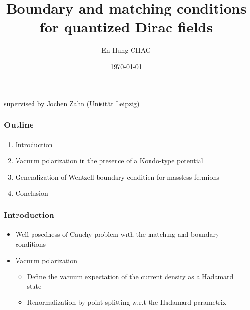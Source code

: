 \documentclass[english]{beamer}
\title{Boundary and matching conditions for quantized Dirac fields}
\author{En-Hung CHAO}
\institute{{\'E}cole Polytechnique \& Universit{\"a}t Leipzig}
\date{\today}
\begin{document}

\begin{frame}
\titlepage%
\centerline{supervised by Jochen Zahn (Unisit{\"a}t Leipzig)}
\end{frame}
\begin{frame}
\frametitle{Outline}
\framesubtitle{}

\begin{enumerate}

\item Introduction
\item Vacuum polarization in the presence of a Kondo-type potential
\item Generalization of Wentzell boundary condition for massless fermions
\item Conclusion

\end{enumerate}

\end{frame}
\begin{frame}
\frametitle{Introduction}
\framesubtitle{}

\begin{itemize}
\item<1-> Well-posedness of Cauchy problem with the matching and boundary conditions
\item<2-> Vacuum polarization 
	\begin{itemize}
		\item Define the vacuum expectation of the current density as a Hadamard state
		\item Renormalization by point-splitting w.r.t the Hadamard parametrix
	\end{itemize}
\end{itemize}

\end{frame}
\end{document}
